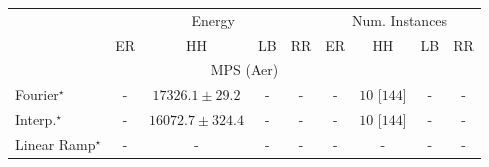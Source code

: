 \begin{tabular}{l|cccc|cccc|}
\toprule
& \multicolumn{4}{c|}{Energy} & \multicolumn{4}{c|}{Num. Instances} \\
            & ER & HH & LB & RR & ER & HH & LB & RR \\
\midrule
\multicolumn{9}{c}{\rule{0pt}{8pt}MPS (Aer)} \\
\midrule
Fourier$^\star$ & {\cellcolor[HTML]{000000}} \color[HTML]{F1F1F1} {\cellcolor{white}} \color{black} - & {\cellcolor[HTML]{4D004B}} \color[HTML]{F1F1F1} $17326.1\pm 29.2$ & {\cellcolor[HTML]{000000}} \color[HTML]{F1F1F1} {\cellcolor{white}} \color{black} - & {\cellcolor[HTML]{000000}} \color[HTML]{F1F1F1} {\cellcolor{white}} \color{black} - & {\cellcolor[HTML]{000000}} \color[HTML]{F1F1F1} {\cellcolor{white}} \color{black} - & {\cellcolor[HTML]{49006A}} \color[HTML]{F1F1F1} $10$ [$144$] & {\cellcolor[HTML]{000000}} \color[HTML]{F1F1F1} {\cellcolor{white}} \color{black} - & {\cellcolor[HTML]{000000}} \color[HTML]{F1F1F1} {\cellcolor{white}} \color{black} - \\
Interp.$^\star$ & {\cellcolor[HTML]{000000}} \color[HTML]{F1F1F1} {\cellcolor{white}} \color{black} - & {\cellcolor[HTML]{CFDFED}} \color[HTML]{000000} $16072.7\pm 324.4$ & {\cellcolor[HTML]{000000}} \color[HTML]{F1F1F1} {\cellcolor{white}} \color{black} - & {\cellcolor[HTML]{000000}} \color[HTML]{F1F1F1} {\cellcolor{white}} \color{black} - & {\cellcolor[HTML]{000000}} \color[HTML]{F1F1F1} {\cellcolor{white}} \color{black} - & {\cellcolor[HTML]{49006A}} \color[HTML]{F1F1F1} $10$ [$144$] & {\cellcolor[HTML]{000000}} \color[HTML]{F1F1F1} {\cellcolor{white}} \color{black} - & {\cellcolor[HTML]{000000}} \color[HTML]{F1F1F1} {\cellcolor{white}} \color{black} - \\
Linear Ramp$^\star$ & {\cellcolor[HTML]{000000}} \color[HTML]{F1F1F1} {\cellcolor{white}} \color{black} - & {\cellcolor[HTML]{000000}} \color[HTML]{F1F1F1} {\cellcolor{white}} \color{black} - & {\cellcolor[HTML]{000000}} \color[HTML]{F1F1F1} {\cellcolor{white}} \color{black} - & {\cellcolor[HTML]{000000}} \color[HTML]{F1F1F1} {\cellcolor{white}} \color{black} - & {\cellcolor[HTML]{000000}} \color[HTML]{F1F1F1} {\cellcolor{white}} \color{black} - & {\cellcolor[HTML]{000000}} \color[HTML]{F1F1F1} {\cellcolor{white}} \color{black} - & {\cellcolor[HTML]{000000}} \color[HTML]{F1F1F1} {\cellcolor{white}} \color{black} - & {\cellcolor[HTML]{000000}} \color[HTML]{F1F1F1} {\cellcolor{white}} \color{black} - \\

\end{tabular}
